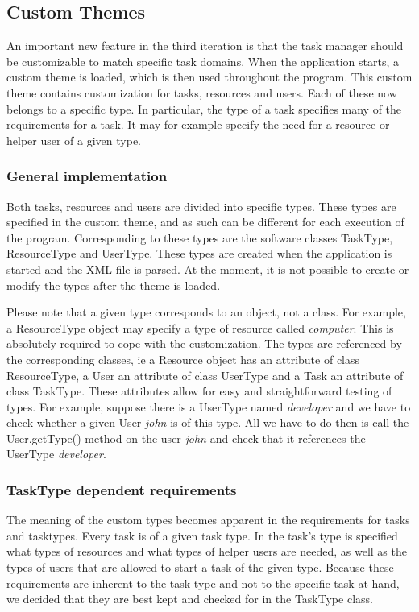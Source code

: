 		\subsection{Custom Themes}
			An important new feature in the third iteration is that the task manager should be customizable to match specific task domains. When the application starts, a custom theme is loaded, which is then used throughout the program. This custom theme contains customization for tasks, resources and users. Each of these now belongs to a specific type. In particular, the type of a task specifies many of the requirements for a task. It may for example specify the need for a resource or helper user of a given type.
			\subsubsection{General implementation}
				Both tasks, resources and users are divided into specific types. These types are specified in the custom theme, and as such can be different for each execution of the program. Corresponding to these types are the software classes TaskType, ResourceType and UserType. These types are created when the application is started and the XML file is parsed. At the moment, it is not possible to create or modify the types after the theme is loaded. 
				
				Please note that a given type corresponds to an object, not a class. For example, a ResourceType object may specify a type of resource called \emph{computer}. This is absolutely required to cope with the customization. The types are referenced by the corresponding classes, ie a Resource object has an attribute of class ResourceType, a User an attribute of class UserType and a Task an attribute of class TaskType. These attributes allow for easy and straightforward testing of types. For example, suppose there is a UserType named \emph{developer} and we have to check whether a given User \emph{john} is of this type. All we have to do then is call the User.getType() method on the user \emph{john} and check that it references the UserType \emph{developer}.
			\subsubsection{TaskType dependent requirements}
				The meaning of the custom types becomes apparent in the requirements for tasks and tasktypes. Every task is of a given task type. In the task's type is specified what types of resources and what types of helper users are needed, as well as the types of users that are allowed to start a task of the given type. Because these requirements are inherent to the task type and not to the specific task at hand, we decided that they are best kept and checked for in the TaskType class.
				

